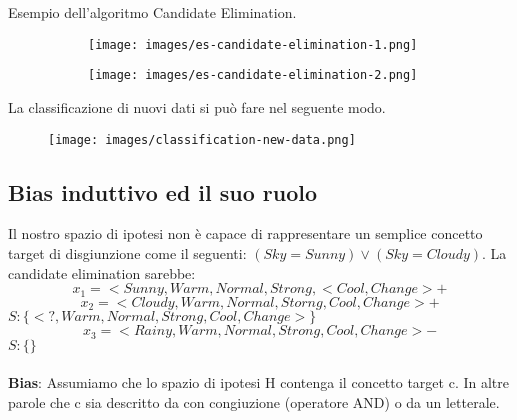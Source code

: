 \begin{example}
    Esempio dell'algoritmo Candidate Elimination.
    \begin{figure}[h!]
        \begin{subfigure}{0.45\textwidth}
            \centering
            \texttt{[image: images/es-candidate-elimination-1.png]}
        \end{subfigure}
        \hspace{10pt}
        \begin{subfigure}{0.45\textwidth}
            \centering
            \texttt{[image: images/es-candidate-elimination-2.png]}
        \end{subfigure}
    \end{figure}
\end{example}
La classificazione di nuovi dati si può fare nel seguente modo.
\begin{figure}[h!]
    \centering
    \texttt{[image: images/classification-new-data.png]}
\end{figure}

\subsection{Bias induttivo ed il suo ruolo}
Il nostro spazio di ipotesi non è capace di rappresentare un semplice concetto target di 
disgiunzione come il seguenti: $(Sky=Sunny) \lor (Sky=Cloudy)$. La candidate elimination sarebbe:
$$x_1 = <Sunny, Warm, Normal, Strong, <Cool, Change> + $$
$$x_2 = <Cloudy, Warm, Normal, Storng, Cool, Change> +$$
$S: \{<?, Warm, Normal, Strong, Cool, Change> \}$
$$x_3 = <Rainy, Warm, Normal, Strong, Cool, Change> -$$
$S: \{\}$\\\\
\textbf{Bias}: Assumiamo che lo spazio di ipotesi H contenga il concetto target c. In altre parole
che c sia descritto da con congiuzione (operatore AND) o da un letterale.


